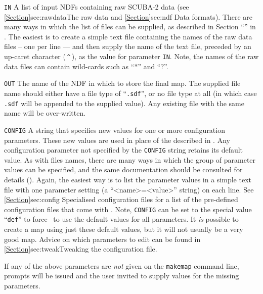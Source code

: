 \begin{aligndesc}
\item[\texttt{IN}] A list of input NDFs containing raw SCUBA-2 data (see
\cref{Section}{sec:rawdata}{The raw data} and \cref{Section}{sec:ndf}
{Data formats}). There are many ways in which the list of files can be supplied,
as described in Section ``''
in . The easiest is to create a simple text
file containing the names of the raw data files -- one per line --- and
then supply the name of the text file, preceded by an up-caret character
(\,\texttt{\^{}}\,), as the value for parameter \texttt{IN}. Note, the names of
the raw data files can contain wild-cards such as ``$*$'' and ``?''.

\item[\texttt{OUT}] The name of the NDF in which to store the final
map. The supplied file name should either have a file type of
``\texttt{.sdf}'', or no file type at all (in which case \texttt{.sdf}
will be appended to the supplied value). Any existing file with the same
name will be over-written.

\item[\texttt{CONFIG}] A string that specifies new values for one or more
configuration parameters. These new values are used in place of the
 described in
. Any configuration parameter not specified by
the \texttt{CONFIG} string retains its default value. As with files
names, there are many ways in which the group of parameter values can be
specified, and the same documentation should be consulted for details
(). Again, the easiest way is to list the
parameter values in a simple text file with one parameter setting (a
``<name>=<value>'' string) on each line. See \cref{Section}{sec:config}
{Specialised configuration files} for a list of the pre-defined
configuration files that come with \smurf. Note, \texttt{CONFIG}
can be set to the special value ``\texttt{def}'' to force \makemap\ to
use the default values for all parameters. It \emph{is} possible to create
a map using just these default values, but it will not usually be a very
good map. Advice on which parameters to edit can be found in
\cref{Section}{sec:tweak}{Tweaking the configuration file}.

\end{aligndesc}

If any of the above parameters are \emph{not} given on the \texttt{makemap}
command line, prompts will be issued and the user invited to supply values
for the missing parameters.

